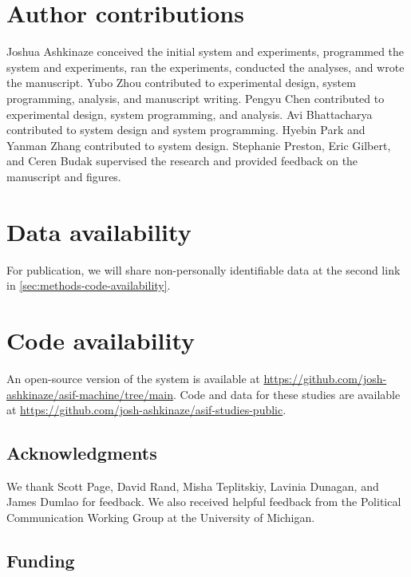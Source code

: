 \documentclass[11pt]{article}
\begin{document}
\section{Author contributions}
\label{sec:methods-author-contributions}

Joshua Ashkinaze conceived the initial system and experiments, programmed the system and experiments, ran the experiments, conducted the analyses, and wrote the manuscript. Yubo Zhou contributed to experimental design, system programming, analysis, and manuscript writing. Pengyu Chen contributed to experimental design, system programming, and analysis. Avi Bhattacharya contributed to system design and system programming. Hyebin Park and Yanman Zhang contributed to system design. Stephanie Preston, Eric Gilbert, and Ceren Budak supervised the research and provided feedback on the manuscript and figures.

\section{Data availability}
\label{sec:methods-data-availability}

For publication, we will share non-personally identifiable data at the second link in  \autoref{sec:methods-code-availability}.

\section{Code availability}
\label{sec:methods-code-availability}

An open-source version of the system is available at \url{https://github.com/josh-ashkinaze/asif-machine/tree/main}. Code and data for these studies are available at \url{https://github.com/josh-ashkinaze/asif-studies-public}.


\begingroup
\raggedright

\endgroup

\subsection{Acknowledgments}
We thank Scott Page, David Rand, Misha Teplitskiy, Lavinia Dunagan, and James Dumlao for feedback. We also received helpful feedback from the Political Communication Working Group at the University of Michigan.

\subsection{Funding}
\label{sec:methods-funding}
\end{document}
